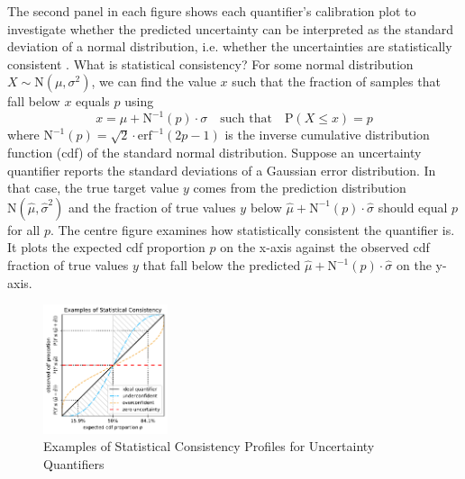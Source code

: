 The second panel in each figure shows each quantifier's calibration plot \cite{uncertainty-calibration-2018} to investigate whether the predicted uncertainty can be interpreted as the standard deviation of a normal distribution, i.e. whether the uncertainties are statistically consistent \cite{uncertainty-metrics-2023}. What is statistical consistency? For some normal distribution $X \sim \text{N}(\mu, \sigma^2)$, we can find the value $x$ such that the fraction of samples that fall below $x$ equals $p$ using
\begin{equation*}
    x = \mu + \text{N}^{-1}(p) \cdot \sigma \quad \text{such that} \quad \text{P}(X \leq x) = p
\end{equation*}
where $\text{N}^{-1}(p) = \sqrt{2} \cdot \text{erf}^{-1}(2p - 1)$ is the inverse cumulative distribution function (cdf) of the standard normal distribution. Suppose an uncertainty quantifier reports the standard deviations of a Gaussian error distribution. In that case, the true target value $y$ comes from the prediction distribution $\text{N}(\hat{\mu}, \hat{\sigma}^2)$ and the fraction of true values $y$ below $\hat{\mu} + \text{N}^{-1}(p) \cdot \hat{\sigma}$ should equal $p$ for all $p$. The centre figure examines how statistically consistent the quantifier is. It plots the expected cdf proportion $p$ on the x-axis against the observed cdf fraction of true values $y$ that fall below the predicted $\hat{\mu} + \text{N}^{-1}(p) \cdot \hat{\sigma}$ on the y-axis.

\begin{figure}
    \centering
    \includegraphics[width=0.325\textwidth]{uncertainty/figures/uq.consistency-examples.pdf}
    \vspace{-1em}
    \caption[Examples of Statistical Consistency Profiles for Uncertainty Quantifiers]{Examples of Statistical Consistency Profiles for Uncertainty Quantifiers}
    \label{fig:uncertainty-consistency}
\end{figure}

